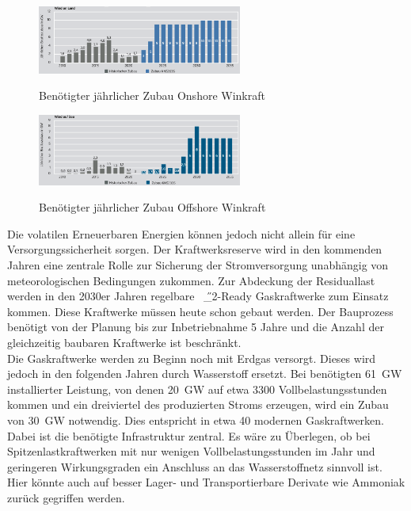 				\begin{figure}[H]
				\centering
				\includegraphics[page=1, clip, width=0.6\textwidth]{./anhang/Zubau Onshore Agora2035.png}
				\caption{Benötigter jährlicher Zubau Onshore Winkraft}
				\label{Abb.Zubau Onshore Agora2035} \cite[S.24]{Agora_KlimaneutralesStromsystem}
			\end{figure}
		
				\begin{figure}[H]
				\centering
				\includegraphics[page=1, clip, width=0.6\textwidth]{./anhang/Zubau Offshore Agora2035.png}
				\caption{Benötigter jährlicher Zubau Offshore Winkraft}
				\label{Abb.Zubau Offshore Agora2035} \cite[S.24]{Agora_KlimaneutralesStromsystem}
			\end{figure}
		Die volatilen Erneuerbaren Energien können jedoch nicht allein für eine Versorgungssicherheit sorgen. Der Kraftwerksreserve wird in den kommenden Jahren eine zentrale Rolle zur Sicherung der Stromversorgung unabhängig von meteorologischen Bedingungen zukommen. Zur Abdeckung der Residuallast werden in den 2030er Jahren regelbare \SI{}{\H{_2}}-Ready Gaskraftwerke zum Einsatz kommen. Diese Kraftwerke müssen heute schon gebaut werden. Der Bauprozess benötigt von der Planung bis zur Inbetriebnahme 5 Jahre und die Anzahl der gleichzeitig baubaren Kraftwerke ist beschränkt.\\
		Die Gaskraftwerke werden zu Beginn noch mit Erdgas versorgt. Dieses wird jedoch in den folgenden Jahren durch Wasserstoff ersetzt. Bei benötigten \SI{61}{\giga \watt} installierter Leistung, von denen \SI{20}{\giga \watt} auf etwa 3300 Vollbelastungsstunden kommen und ein dreiviertel des produzierten Stroms erzeugen, wird ein Zubau von \SI{30}{\giga \watt} notwendig. \cite[S.9]{Agora_KlimaneutralesStromsystem} Dies entspricht in etwa 40 modernen Gaskraftwerken. Dabei ist die benötigte Infrastruktur zentral. Es wäre zu Überlegen, ob bei Spitzenlastkraftwerken mit nur wenigen Vollbelastungsstunden im Jahr und geringeren Wirkungsgraden ein Anschluss an das Wasserstoffnetz sinnvoll ist. Hier könnte auch auf besser Lager- und Transportierbare Derivate wie Ammoniak zurück gegriffen werden.\\
		
